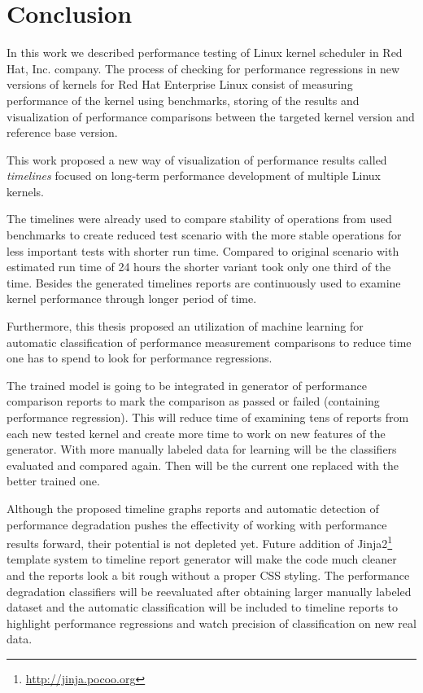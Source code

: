 \chapter{Conclusion}
In this work we described performance testing of Linux kernel scheduler in Red
Hat, Inc. company. The process of checking for performance regressions in new
versions of kernels for Red Hat Enterprise Linux consist of measuring
performance of the kernel using benchmarks, storing of the results and
visualization of performance comparisons between the targeted kernel version and
reference base version.

This work proposed a new way of visualization of performance results called
\emph{timelines} focused on long-term performance development of multiple Linux
kernels.

The timelines were already used to compare stability of operations from used
benchmarks to create reduced test scenario with the more stable operations for
less important tests with shorter run time. Compared to original scenario with
estimated run time of 24 hours the shorter variant took only one third of the
time. Besides the generated timelines reports are continuously used to examine
kernel performance through longer period of time.

Furthermore, this thesis proposed an utilization of machine learning for
automatic classification of performance measurement comparisons to reduce time
one has to spend to look for performance regressions.

The trained model is going to be integrated in generator of performance
comparison reports to mark the comparison as passed or failed (containing
performance regression). This will reduce time of examining tens of reports from
each new tested kernel and create more time to work on new features of the
generator. With more manually labeled data for learning will be the classifiers
evaluated and compared again. Then will be the current one replaced with the
better trained one.

Although the proposed timeline graphs reports and automatic detection of
performance degradation pushes the effectivity of working with performance
results forward, their potential is not depleted yet. Future addition of
Jinja2\footnote{\url{http://jinja.pocoo.org}} template system to timeline report
generator will make the code much cleaner and the reports look a bit rough
without a proper CSS styling. The performance degradation classifiers will be
reevaluated after obtaining larger manually labeled dataset and the automatic
classification will be included to timeline reports to highlight performance
regressions and watch precision of classification on new real data.



